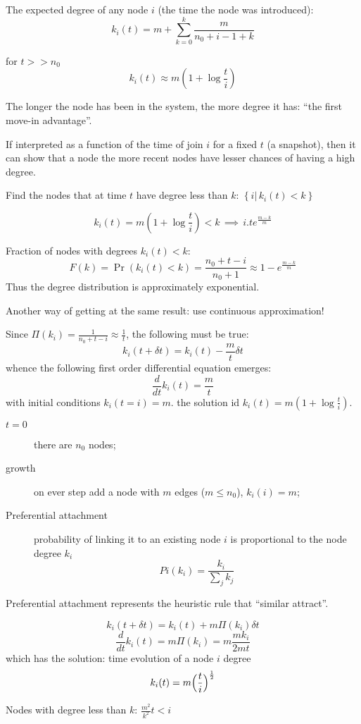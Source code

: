 \documentclass[a4paper]{article}
\newcommand{\obj}[1]{{\left\{ #1 \right \}}}
\newcommand{\brac}[1]{{\left ( #1 \right )}}
\newcommand{\induc}[1]{{\left . #1 \right \vert}}
\begin{document}
The expected degree of any node $i$ (the time the node was introduced):
\[k_i(t) = m + \sum_{k=0}^k\frac{m}{n_0+i-1 + k}\]

for $t>>n_0$
\[k_i(t) \approx m \brac{1 + \log\frac{t}{i}}\]

The longer the node has been in the system, the more degree it has: ``the first move-in advantage''.

If interpreted as a function of the time of join $i$ for a fixed $t$ (a snapshot), then it can show that a node the more recent nodes have lesser chances of having a high degree.


Find the nodes that at time $t$ have degree less than $k$: $\obj{\induc{i}\,k_i(t) < k}$

\[k_i(t) = m\brac{1+\log\frac{t}{i}}<k\,\implies\, i . t e^\frac{m-k}{m}\]

Fraction of nodes with degrees $k_i(t)<k$:
\[F(k) = \Pr\brac{k_i(t)<k} = \frac{n_0+t-i}{n_0+1} \approx 1 - e^\frac{m-k}{m}\]
Thus the degree distribution is approximately exponential.


Another way of getting at the same result: use continuous approximation!

Since $\Pi(k_i) = \frac{1}{n_0+t-i} \approx \frac{1}{t}$, the following must be true:
\[k_i(t+\delta t) = k_i(t) - \frac{m}{t}\delta t\]
whence the following first order differential equation emerges:
\[\frac{d}{dt}k_i(t) = \frac{m}{t}\]
with initial conditions $k_i(t=i) = m$.
the solution id $k_i(t) = m\brac{1+\log\frac{t}{i}}$.

\begin{description}
	\item[$t=0$] there are $n_0$ nodes;
	\item[growth] on ever step add a node with $m$ edges ($m\leq n_0$), $k_i(i)=m$;
	\item[Preferential attachment] probability of linking it to an existing node $i$ is proportional to the node degree $k_i$
	\[Pi(k_i) = \frac{k_i}{\sum_j k_j}\]
\end{description}

Preferential attachment represents the heuristic rule that ``similar attract''.

\[k_i(t+\delta t) = k_i(t) + m \Pi(k_i)\delta t\]
\[\frac{d}{dt}k_i(t) = m \Pi(k_i) = m \frac{m k_i}{2 m t}\]
which has the solution: time evolution of a node $i$ degree
\[k_i(t) = m\Bigl(\frac{t}{i}\Bigr)^\frac{1}{2}\]

Nodes with degree less than $k$: $\frac{m^2}{k^2} t<i$
\end{document}
